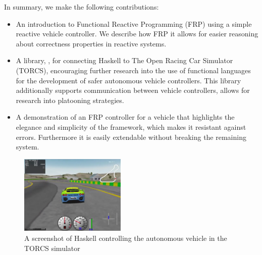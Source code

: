 In summary, we make the following contributions:

\begin{itemize}
\item An introduction to Functional Reactive Programming (FRP) using a simple reactive vehicle controller. We describe how FRP it allows for easier reasoning about correctness properties in reactive systems.

\item A library, \ourLib, for connecting Haskell to The Open Racing Car Simulator (TORCS), encouraging further research into the use of functional languages for the development of safer autonomous vehicle controllers. This library additionally supports communication between vehicle controllers, allows for research into platooning strategies.

\item A demonstration of an FRP controller for a vehicle that highlights the elegance and simplicity of the framework,
   which makes it resistant against errors. Furthermore it is easily extendable without breaking the remaining system.

\end{itemize}

\begin{figure}[t]
\includegraphics[width=0.45\textwidth]{figs/racing.png}
\caption{A screenshot of Haskell controlling the autonomous vehicle in the TORCS simulator}
\label{fig:race}
\end{figure}
